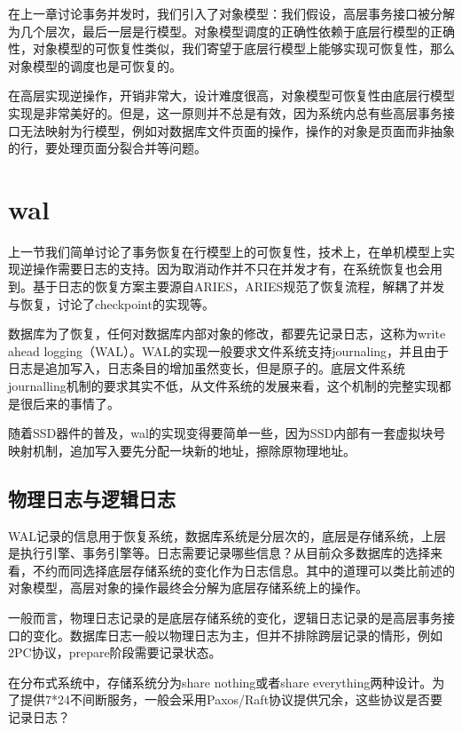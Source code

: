 在上一章讨论事务并发时，我们引入了对象模型：我们假设，高层事务接口被分解为几个层次，最后一层是行模型。对象模型调度的正确性依赖于底层行模型的正确性，对象模型的可恢复性类似，我们寄望于底层行模型上能够实现可恢复性，那么对象模型的调度也是可恢复的。

在高层实现逆操作，开销非常大，设计难度很高，对象模型可恢复性由底层行模型实现是非常美好的。但是，这一原则并不总是有效，因为系统内总有些高层事务接口无法映射为行模型，例如对数据库文件页面的操作，操作的对象是页面而非抽象的行，要处理页面分裂合并等问题。

\section{wal}

上一节我们简单讨论了事务恢复在行模型上的可恢复性，技术上，在单机模型上实现逆操作需要日志的支持。因为取消动作并不只在并发才有，在系统恢复也会用到。基于日志的恢复方案主要源自ARIES\cite{mohan1992aries}，ARIES规范了恢复流程，解耦了并发与恢复，讨论了checkpoint的实现等。

数据库为了恢复，任何对数据库内部对象的修改，都要先记录日志，这称为write ahead logging（WAL）。WAL的实现一般要求文件系统支持journaling，并且由于日志是追加写入，日志条目的增加虽然变长，但是原子的。底层文件系统journalling机制的要求其实不低，从文件系统的发展来看，这个机制的完整实现都是很后来的事情了。

随着SSD器件的普及，wal的实现变得要简单一些\cite{GitHubgo38:online}，因为SSD内部有一套虚拟块号映射机制，追加写入要先分配一块新的地址，擦除原物理地址。

\subsection{物理日志与逻辑日志}

WAL记录的信息用于恢复系统，数据库系统是分层次的，底层是存储系统，上层是执行引擎、事务引擎等。日志需要记录哪些信息？从目前众多数据库的选择来看，不约而同选择底层存储系统的变化作为日志信息。其中的道理可以类比前述的对象模型，高层对象的操作最终会分解为底层存储系统上的操作。

一般而言，物理日志记录的是底层存储系统的变化，逻辑日志记录的是高层事务接口的变化。数据库日志一般以物理日志为主，但并不排除跨层记录的情形，例如2PC协议，prepare阶段需要记录状态。

\begin{exercise}
    在分布式系统中，存储系统分为share nothing或者share everything两种设计。为了提供7*24不间断服务，一般会采用Paxos/Raft协议提供冗余，这些协议是否要记录日志？
\end{exercise}

